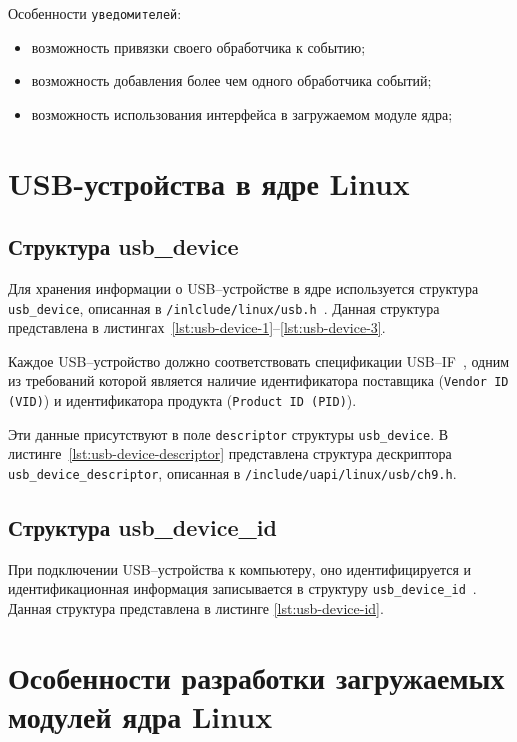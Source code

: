 Особенности \texttt{уведомителей}:

\begin{itemize}
	\item возможность привязки своего обработчика к событию;
	\item возможность добавления более чем одного обработчика событий;
	\item возможность использования интерфейса в загружаемом модуле ядра;
\end{itemize}

\section{USB-устройства в ядре Linux}

\subsection{Структура usb\_device}

Для хранения информации о USB--устройстве в ядре используется структура \texttt{usb\_device}, описанная в \texttt{/inlclude/linux/usb.h}~\cite{usb_device}. Данная структура представлена в листингах~\ref{lst:usb-device-1}--\ref{lst:usb-device-3}.

Каждое USB--устройство должно соответствовать спецификации USB--IF~\cite{usbspec}, одним из требований которой является наличие идентификатора поставщика (\texttt{Vendor ID (VID)}) и идентификатора продукта (\texttt{Product ID (PID)}). 

Эти данные присутствуют в поле \texttt{descriptor} структуры \texttt{usb\_device}. В листинге~\ref{lst:usb-device-descriptor} представлена структура дескриптора \texttt{usb\_device\_descriptor}, описанная в \texttt{/include/uapi/linux/usb/ch9.h}.

\subsection{Структура usb\_device\_id}

При подключении USB--устройства к компьютеру, оно идентифицируется и идентификационная информация записывается в структуру \texttt{usb\_device\_id}~\cite{usb_device_id}. Данная структура представлена в листинге \ref{lst:usb-device-id}.

\section{Особенности разработки загружаемых модулей ядра Linux}

